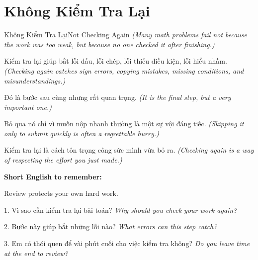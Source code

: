 \section{Không Kiểm Tra Lại}
\begin{truyen}{Không Kiểm Tra Lại}{Not Checking Again}
\textit{(Many math problems fail not because the work was too weak, but because no one checked it after finishing.)}

Kiểm tra lại giúp bắt lỗi dấu, lỗi chép, lỗi thiếu điều kiện, lỗi hiểu nhầm.
\textit{(Checking again catches sign errors, copying mistakes, missing conditions, and misunderstandings.)}

Đó là bước sau cùng nhưng rất quan trọng.
\textit{(It is the final step, but a very important one.)}

Bỏ qua nó chỉ vì muốn nộp nhanh thường là một sự vội đáng tiếc.
\textit{(Skipping it only to submit quickly is often a regrettable hurry.)}
\end{truyen}

\begin{baihoc}
Kiểm tra lại là cách tôn trọng công sức mình vừa bỏ ra.
\textit{(Checking again is a way of respecting the effort you just made.)}
\end{baihoc}

\begin{ghinhoanh}
\textbf{Short English to remember:}

Review protects your own hard work.

\end{ghinhoanh}

\begin{tuhocnhanh}
1. Vì sao cần kiểm tra lại bài toán? \textit{Why should you check your work again?}

2. Bước này giúp bắt những lỗi nào? \textit{What errors can this step catch?}

3. Em có thói quen để vài phút cuối cho việc kiểm tra không? \textit{Do you leave time at the end to review?}
\end{tuhocnhanh}
\ngancach